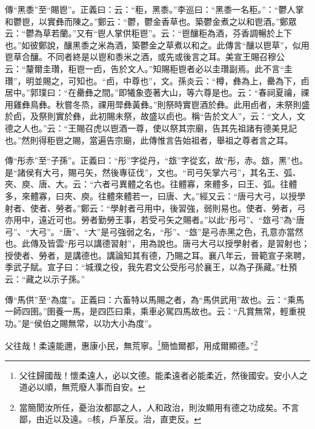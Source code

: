 {\noindent\zhuan{}\fzbyks 傳“黑黍”至“賜鬯”。正義曰：云：“秬，黑黍。”李巡曰：“黑黍一名秬。”：“鬱人掌和鬱鬯，以實彝而陳之。”鄭云：“鬱，鬱金香草也。築鬱金煮之以和鬯酒。”鄭眾云：“鬱為草若蘭。”又有“鬯人掌供秬鬯”。云：“鬯釀秬為酒，芬香調暢於上下也。”如彼鄭說，釀黑黍之米為酒，築鬱金之草煮以和之。此傳言“釀以鬯草”，似用鬯草合釀。不同者終是以鬯和黍米之酒，或先或後言之耳。美宣王賜召穆公云：“釐爾圭瓚，秬鬯一卣，告於文人。”知賜秬鬯者必以圭瓚副焉。此不言“圭瓚”，明並賜之，可知也。“卣，中尊也”，文。孫炎云：“樽，彝為上，罍為下，卣居中。”郭璞曰：“在罍彝之間。”即犧象壺著大山，等六尊是也。云：“春祠夏禴，祼用雞彝鳥彝。秋嘗冬烝，祼用斝彝黃彝。”則祭時實鬯酒於彝。此用卣者，未祭則盛於卣，及祭則實於彝，此初賜未祭，故盛以卣也。稱“告於文人”，云：“文人，文德之人也。”云：“王賜召虎以鬯酒一尊，使以祭其宗廟，告其先祖諸有德美見記也。”然則得秬鬯之賜，當遍告宗廟，此傳惟言告始祖者，舉祖之尊者言之耳。 \par}

{\noindent\zhuan{}\fzbyks 傳“彤赤”至“子孫”。正義曰：“彤”字從丹，“玈”字從玄，故“彤，赤。玈，黑”也。是“諸侯有大弓，賜弓矢，然後專征伐”，文也。“司弓矢掌六弓”，其名王、弧、夾、庾、唐、大。云：“六者弓異體之名也。往體寡，來體多，曰王、弧。往體多，來體寡，曰夾、庾。往體來體若一，曰唐、大。”經又云：“唐弓大弓，以授學射者、使者、勞者。”鄭云：“學射者弓用中，後習強，弱則易也。使者、勞者，弓亦用中，遠近可也。勞者勤勞王事，若受弓矢之賜者。”以此“彤弓”、“玈弓”為“唐弓”、“大弓”。“唐”、“大”是弓強弱之名，“彤”、“玈”是弓赤黑之色，孔意亦當然也。此傳及皆雲“彤弓以講德習射”，用為說也。唐弓大弓以授學射者，是習射也；授使者、勞者，是講德也。講論知其有德，乃賜之耳。襄八年云，晉範宣子來聘，季武子賦。宣子曰：“城濮之役，我先君文公受彤弓於襄王，以為子孫藏。”杜預云：“藏之以示子孫。” \par}

{\noindent\zhuan{}\fzbyks 傳“馬供”至“為度”。正義曰：六畜特以馬賜之者，為“馬供武用”故也。云：“乘馬一師四圉。”圉養一馬，是四匹曰乘，乘車必駕四馬故也。云：“凡賞無常，輕重視功。”是“侯伯之賜無常，以功大小為度”。 \par}

父往哉！柔遠能邇，惠康小民，無荒寧。\footnote{父往歸國哉！懷柔遠人，必以文德。能柔遠者必能柔近，然後國安。安小人之道必以順，無荒廢人事而自安。}簡恤爾都，用成爾顯德。”\footnote{當簡閡汝所任，憂治汝都鄙之人，人和政治，則汝顯用有德之功成矣。不言鄙，由近以及遠。○核，戶革反。治，直吏反。}

